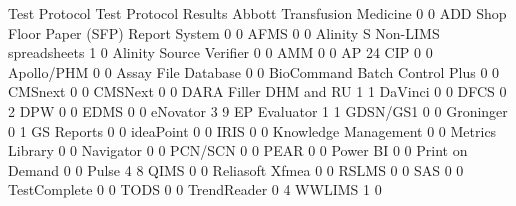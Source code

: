 \documentclass{article}
\begin{document}
\begin{Schunk}
\begin{Soutput}
                                           Test Protocol Test Protocol Results
  Abbott Transfusion Medicine                          0                     0
  ADD Shop Floor Paper (SFP) Report System             0                     0
  AFMS                                                 0                     0
  Alinity S Non-LIMS spreadsheets                      1                     0
  Alinity Source Verifier                              0                     0
  AMM                                                  0                     0
  AP 24 CIP                                            0                     0
  Apollo/PHM                                           0                     0
  Assay File Database                                  0                     0
  BioCommand Batch Control Plus                        0                     0
  CMSnext                                              0                     0
  CMSNext                                              0                     0
  DARA Filler DHM and RU                               1                     1
  DaVinci                                              0                     0
  DFCS                                                 0                     2
  DPW                                                  0                     0
  EDMS                                                 0                     0
  eNovator                                             3                     9
  EP Evaluator                                         1                     1
  GDSN/GS1                                             0                     0
  Groninger                                            0                     1
  GS Reports                                           0                     0
  ideaPoint                                            0                     0
  IRIS                                                 0                     0
  Knowledge Management                                 0                     0
  Metrics Library                                      0                     0
  Navigator                                            0                     0
  PCN/SCN                                              0                     0
  PEAR                                                 0                     0
  Power BI                                             0                     0
  Print on Demand                                      0                     0
  Pulse                                                4                     8
  QIMS                                                 0                     0
  Reliasoft Xfmea                                      0                     0
  RSLMS                                                0                     0
  SAS                                                  0                     0
  TestComplete                                         0                     0
  TODS                                                 0                     0
  TrendReader                                          0                     4
  WWLIMS                                               1                     0
                                          

\end{Soutput}
\end{Schunk}
\end{document}

